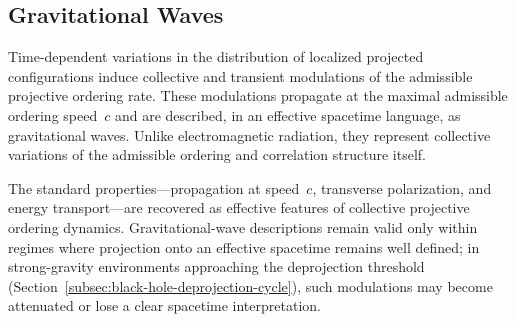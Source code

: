 \subsection{Gravitational Waves}
  \label{subsec:gravitational-waves}

  Time-dependent variations in the distribution of localized projected
  configurations induce collective and transient modulations of the
  admissible projective ordering rate.
  These modulations propagate at the maximal admissible ordering speed~$c$
  and are described, in an effective spacetime language, as gravitational
  waves.
  Unlike electromagnetic radiation, they represent collective variations of
  the admissible ordering and correlation structure itself.

  The standard properties---propagation at speed~$c$, transverse
  polarization, and energy transport---are recovered as effective features
  of collective projective ordering dynamics.
  Gravitational-wave descriptions remain valid only within regimes where
  projection onto an effective spacetime remains well defined; in
  strong-gravity environments approaching the deprojection threshold
  (Section~\ref{subsec:black-hole-deprojection-cycle}), such modulations
  may become attenuated or lose a clear spacetime interpretation.
